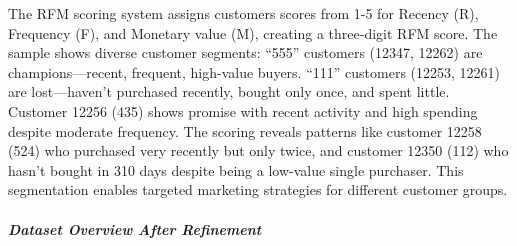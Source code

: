 \documentclass[
]{article}
\newenvironment{Shaded}{\begin{snugshade}}{\end{snugshade}}
\newcommand{\AttributeTok}[1]{\textcolor[rgb]{0.13,0.29,0.53}{#1}}
\newcommand{\FunctionTok}[1]{\textcolor[rgb]{0.13,0.29,0.53}{\textbf{#1}}}
\newcommand{\NormalTok}[1]{#1}
\newcommand{\OtherTok}[1]{\textcolor[rgb]{0.56,0.35,0.01}{#1}}
\newcommand{\SpecialCharTok}[1]{\textcolor[rgb]{0.81,0.36,0.00}{\textbf{#1}}}
\newcommand{\StringTok}[1]{\textcolor[rgb]{0.31,0.60,0.02}{#1}}
\begin{document}
The RFM scoring system assigns customers scores from 1-5 for Recency
(R), Frequency (F), and Monetary value (M), creating a three-digit RFM
score. The sample shows diverse customer segments: ``555'' customers
(12347, 12262) are champions---recent, frequent, high-value buyers.
``111'' customers (12253, 12261) are lost---haven't purchased recently,
bought only once, and spent little. Customer 12256 (435) shows promise
with recent activity and high spending despite moderate frequency. The
scoring reveals patterns like customer 12258 (524) who purchased very
recently but only twice, and customer 12350 (112) who hasn't bought in
310 days despite being a low-value single purchaser. This segmentation
enables targeted marketing strategies for different customer
groups.\newpage

\subparagraph{Dataset Overview After
Refinement}\label{dataset-overview-after-refinement}

\begin{Shaded}
\end{Shaded}
\end{document}
